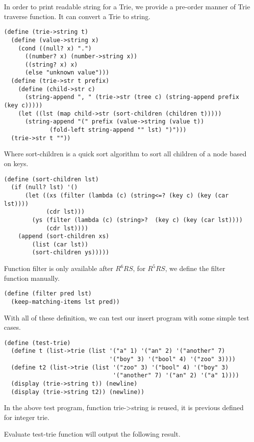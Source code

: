\documentclass{article}
\begin{document}
In order to print readable string for a Trie, we provide a pre-order
manner of Trie traverse function. It can convert a Trie to string.

\begin{lstlisting}
(define (trie->string t)
  (define (value->string x)
    (cond ((null? x) ".")
	  ((number? x) (number->string x))
	  ((string? x) x)
	  (else "unknown value")))
  (define (trie->str t prefix)
    (define (child->str c)
      (string-append ", " (trie->str (tree c) (string-append prefix (key c)))))
    (let ((lst (map child->str (sort-children (children t)))))
      (string-append "(" prefix (value->string (value t))
		     (fold-left string-append "" lst) ")")))
  (trie->str t ""))
\end{lstlisting}

Where sort-children is a quick sort algorithm to sort all children of
a node based on keys.

\begin{lstlisting}
(define (sort-children lst)
  (if (null? lst) '()
      (let ((xs (filter (lambda (c) (string<=? (key c) (key (car lst)))) 
			(cdr lst)))
	    (ys (filter (lambda (c) (string>?  (key c) (key (car lst)))) 
			(cdr lst))))
	(append (sort-children xs) 
		(list (car lst))
		(sort-children ys)))))
\end{lstlisting}

Function filter is only available after $R^6RS$, for $R^5RS$, we define
the filter function manually.

\begin{lstlisting}
(define (filter pred lst)
  (keep-matching-items lst pred))
\end{lstlisting}

With all of these definition, we can test our insert program with some
simple test cases.

\begin{lstlisting}
(define (test-trie)
  (define t (list->trie (list '("a" 1) '("an" 2) '("another" 7) 
                              '("boy" 3) '("bool" 4) '("zoo" 3))))
  (define t2 (list->trie (list '("zoo" 3) '("bool" 4) '("boy" 3) 
                               '("another" 7) '("an" 2) '("a" 1))))
  (display (trie->string t)) (newline)
  (display (trie->string t2)) (newline))
\end{lstlisting}

In the above test program, function trie->string is reused, it is
previous defined for integer trie.

Evaluate test-trie function will output the following result.
\end{document}
